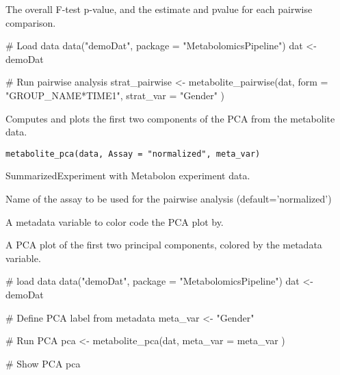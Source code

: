 \documentclass[a4paper]{book}
\begin{document}
%
\begin{Value}
The overall F-test p-value, and the estimate and pvalue for each
pairwise comparison.
\end{Value}
%
\begin{Examples}
\begin{ExampleCode}
# Load data
data("demoDat", package = "MetabolomicsPipeline")
dat <- demoDat

# Run pairwise analysis
strat_pairwise <- metabolite_pairwise(dat,
    form = "GROUP_NAME*TIME1",
    strat_var = "Gender"
)

\end{ExampleCode}
\end{Examples}
%
\begin{Description}
Computes and plots the first two components of the PCA from the metabolite
data.
\end{Description}
%
\begin{Usage}
\begin{verbatim}
metabolite_pca(data, Assay = "normalized", meta_var)
\end{verbatim}
\end{Usage}
%
\begin{Arguments}
\begin{ldescription}
\item[\code{data}] SummarizedExperiment with Metabolon experiment data.

\item[\code{Assay}] Name of the assay to be used for the pairwise analysis
(default='normalized')

\item[\code{meta\_var}] A metadata variable to color code the PCA plot by.
\end{ldescription}
\end{Arguments}
%
\begin{Value}
A PCA plot of the first two principal components, colored by the
metadata variable.
\end{Value}
%
\begin{Examples}
\begin{ExampleCode}

# load data
data("demoDat", package = "MetabolomicsPipeline")
dat <- demoDat

# Define PCA label from metadata
meta_var <- "Gender"

# Run PCA
pca <- metabolite_pca(dat,
    meta_var = meta_var
)


# Show PCA
pca

\end{ExampleCode}
\end{Examples}
\end{document}
